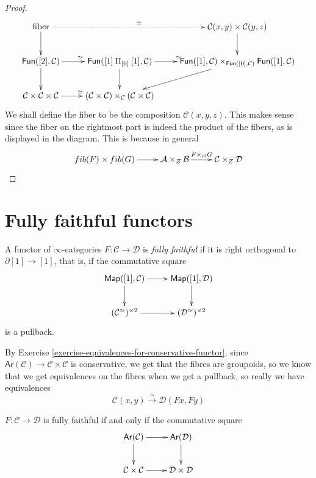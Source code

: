 \begin{proof}
$$
\xymatrix{
\text{fiber}\ar[d]\ar@{.>}[rr]^{\simeq}&&
\mathcal{C}(x,y)\times \mathcal{C}(y,z)\ar[d]\\
\mathsf{Fun}([2],\mathcal{C})\ar[r]^{\simeq}\ar[d]&
\mathsf{Fun}([1]\amalg_{[0]}[1],\mathcal{C})\ar[r]^{\simeq}\ar[d]
&\mathsf{Fun}([1],\mathcal{C})\times_{\mathsf{Fun}([0],\mathcal{C})}
\mathsf{Fun}([1],\mathcal{C})\ar[ld]\\
\mathcal{C}\times\mathcal{C}\times\mathcal{C}\ar[r]^{\simeq}&
(\mathcal{C} \times \mathcal{C})
\times_{\mathcal{C}}(\mathcal{C}\times\mathcal{C})
}
$$
We shall define the fiber to be the
composition $\mathcal{C}(x,y,z)$.
This makes sense since
the fiber on the rightmost part
is indeed the product of the fibers, 
as is displayed in the diagram.
This is because in general
$$
\xymatrix{
fib(F)\times fib(G)\ar[r]&  \mathcal{A}\times_Z \mathcal{B}
\ar[r]^{F\times_{\text{id}}G}&
\mathcal{C}\times_Z \mathcal{D}
}
$$
\end{proof}


\section{Fully faithful functors}
\label{section-fully-faithful-functors}

\begin{definition}
\label{definition-fully-faithful}
A functor of $\infty$-categories $F:\mathcal{C} \to \mathcal{D}$ 
is {\it fully faithful} if it is
right orthogonal to $\partial[1] \to [1]$,
that is, if the commutative square
$$
\xymatrix{
\mathsf{Map}([1],\mathcal{C})\ar[r]\ar[d]&
\mathsf{Map}([1],\mathcal{D})\ar[d]\\
(\mathcal{C}^\simeq)^{\times 2}\ar[r]&
(\mathcal{D}^\simeq)^{\times 2}
}
$$
is a pullback.
\end{definition}

By Exercise \ref{exercise-equivalences-for-conservative-functor}, since 
$\mathsf{Ar}(\mathcal{C})\to \mathcal{C}\times\mathcal{C}$
is conservative, we get that the fibres
are groupoids, so we know that we get equivalences
on the fibres when we get a pullback, so really we have
equivalences
$$
\mathcal{C}(x,y)\xrightarrow{\simeq}\mathcal{D}(Fx,Fy)
$$
\begin{proposition}
\label{proposition-fullt-faithfull-iff-pullback}
$F:\mathcal{C} \to \mathcal{D}$ is fully faithful
if and only if the commutative square
$$
\xymatrix{
\mathsf{Ar}(\mathcal{C})\ar[r]\ar[d]&\mathsf{Ar}(\mathcal{D})\ar[d]\\
\mathcal{C}\times\mathcal{C}\ar[r]&\mathcal{D}\times\mathcal{D}
}
$$
\end{proposition}

